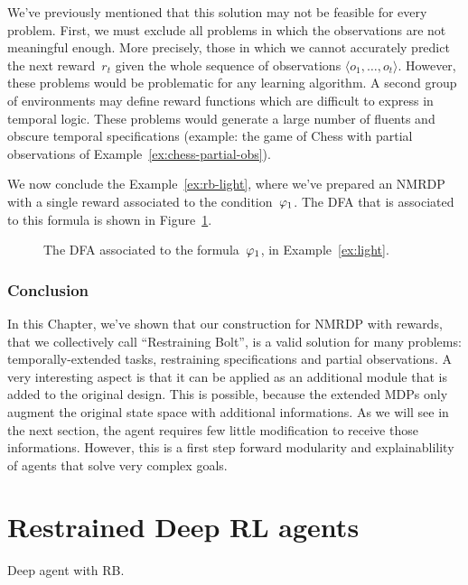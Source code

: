 We've previously mentioned that this solution may not be feasible for every
problem. First, we must exclude all problems in which the observations are not
meaningful enough. More precisely, those in which we cannot accurately predict
the next reward~$r_t$ given the whole sequence of observations $\langle o_1,
\dots, o_t \rangle$. However, these problems would be problematic for any
learning algorithm. A second group of environments may define reward
functions which are difficult to express in temporal logic. These problems
would generate a large number of fluents and obscure temporal specifications
(example: the game of Chess with partial observations of
Example~\ref{ex:chess-partial-obs}).

\begin{example}
	We now conclude the Example~\ref{ex:rb-light}, where we've prepared an NMRDP
	with a single \ldl{} reward associated to the condition~$\varphi_1$. The
	DFA that is associated to this formula is shown in
	Figure~\ref{fig:rb-light-automa}.
	\begin{figure}
			\centering
			\caption{The DFA associated to the formula~$\varphi_1$, in
			Example~\ref{ex:light}.}
			\label{fig:rb-light-automa}
	\end{figure}
\end{example}



\subsubsection*{Conclusion}

In this Chapter, we've shown that our construction for NMRDP with \ldl{}
rewards, that we collectively call ``Restraining Bolt'', is a valid solution
for many problems: temporally-extended tasks, restraining specifications and
partial observations. A very interesting aspect is that it can be applied as
an additional module that is added to the original design. This is possible,
because the extended MDPs only augment the original state space with
additional informations. As we will see in the next section, the agent
requires few little modification to receive those informations. However, this
is a first step forward modularity and explainablility of agents that solve
very complex goals.


\section{Restrained Deep RL agents}

\label{sec:rb-deep-model}

Deep agent with RB.
